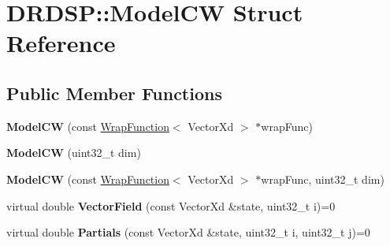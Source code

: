 \hypertarget{struct_d_r_d_s_p_1_1_model_c_w}{\section{D\-R\-D\-S\-P\-:\-:Model\-C\-W Struct Reference}
\label{struct_d_r_d_s_p_1_1_model_c_w}
}
\subsection*{Public Member Functions}
\begin{DoxyCompactItemize}
\item 
\hypertarget{struct_d_r_d_s_p_1_1_model_c_w_aad20306afd9f81ea9533041b4a71b35c}{{\bfseries Model\-C\-W} (const \hyperlink{struct_d_r_d_s_p_1_1_wrap_function}{Wrap\-Function}$<$ Vector\-Xd $>$ $\ast$wrap\-Func)}\label{struct_d_r_d_s_p_1_1_model_c_w_aad20306afd9f81ea9533041b4a71b35c}

\item 
\hypertarget{struct_d_r_d_s_p_1_1_model_c_w_a49ebb648ddbec569e773bd6370f47116}{{\bfseries Model\-C\-W} (uint32\-\_\-t dim)}\label{struct_d_r_d_s_p_1_1_model_c_w_a49ebb648ddbec569e773bd6370f47116}

\item 
\hypertarget{struct_d_r_d_s_p_1_1_model_c_w_a2b62d9bd8355ee9661e64818d0de8667}{{\bfseries Model\-C\-W} (const \hyperlink{struct_d_r_d_s_p_1_1_wrap_function}{Wrap\-Function}$<$ Vector\-Xd $>$ $\ast$wrap\-Func, uint32\-\_\-t dim)}\label{struct_d_r_d_s_p_1_1_model_c_w_a2b62d9bd8355ee9661e64818d0de8667}

\item 
\hypertarget{struct_d_r_d_s_p_1_1_model_c_w_a4c01cef09698f8bed8ef2e90e130ad8f}{virtual double {\bfseries Vector\-Field} (const Vector\-Xd \&state, uint32\-\_\-t i)=0}\label{struct_d_r_d_s_p_1_1_model_c_w_a4c01cef09698f8bed8ef2e90e130ad8f}

\item 
\hypertarget{struct_d_r_d_s_p_1_1_model_c_w_a54b6149ba78bba42b360868fa8ecfc20}{virtual double {\bfseries Partials} (const Vector\-Xd \&state, uint32\-\_\-t i, uint32\-\_\-t j)=0}\label{struct_d_r_d_s_p_1_1_model_c_w_a54b6149ba78bba42b360868fa8ecfc20}

\end{DoxyCompactItemize}
